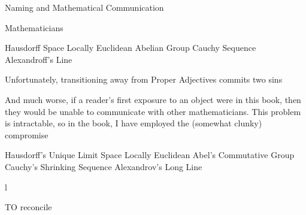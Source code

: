 \begin{boxNote}{Naming and Mathematical Communication}

Mathematicians


Hausdorff Space
Locally Euclidean
Abelian Group
Cauchy Sequence
Alexandroff's Line

Unfortunately, transitioning away from Proper Adjectives commits two sins

And much worse, if a reader's first exposure to an object were in this book, then they would be unable to communicate with other mathematicians.
This problem is intractable, so in the book, I have employed the (somewhat clunky) compromise


Hausdorff's Unique Limit Space
Locally Euclidean
Abel's Commutative Group
Cauchy's Shrinking Sequence
Alexandrov's Long Line

l

TO reconcile 


\end{boxNote}

